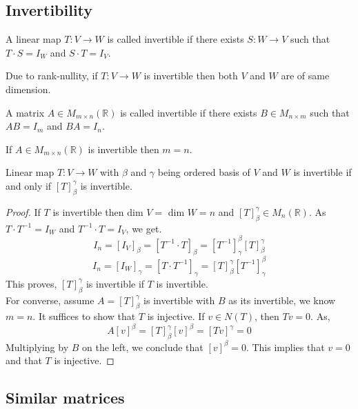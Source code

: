 \documentclass[11pt,a4paper]{colorart}
\def\l{\left}
\def\r{\right}
\def\R{\mathbb{R}}
\def\b{\beta}
\def\g{\gamma}
\begin{document}
\subsection{Invertibility}

\begin{definition}
	A linear map $T:V\rightarrow W$ is called invertible if there exists $S:W\rightarrow V$ such that $T\cdot S = I_W$ and $S\cdot T = I_V$.
\end{definition}

\begin{remark}
	Due to rank-nullity, if $T:V\rightarrow W$ is invertible then both $V$ and $W$ are of same dimension.
\end{remark}

\begin{definition}
	A matrix $A\in M_{m\times n}\l(\R\r)$ is called invertible if there exists $B\in M_{n\times m}$ such that $AB = I_m$ and $BA=I_n$.
\end{definition}

\begin{remark}
	If $A\in M_{m\times n}\l(\R\r)$ is invertible then $m=n$.
\end{remark}

\begin{theorem}
	Linear map $T:V\rightarrow W$ with $\b$ and $\g$ being ordered basis of $V$ and $W$ is invertible if and only if $\l[T\r]^\g_\b$ is invertible.
\end{theorem}

\begin{proof}
	If $T$ is invertible then dim $V = $ dim $W = n$ and $\l[T\r]_\b^\g\in M_n\l(\R\r)$. As $T\cdot T^{-1} = I_W$ and $T^{-1}\cdot T = I_V$, we get.
	\[ I_n = \l[I_V\r]_\b = \l[T^{-1}\cdot T\r]_\b = \l[T^{-1}\r]^\b_\g \l[T\r]^\g_\b \]
	\[ I_n = \l[I_W\r]_\g = \l[T\cdot T^{-1}\r]_\g = \l[T\r]^\g_\b \l[T^{-1}\r]^\b_\g \]
	This proves, $\l[T\r]^\g_\b$ is invertible if $T$ is invertible.\\
	For converse, assume $A= \l[T\r]^\g_\b$ is invertible with $B$ as its invertible, we know $m=n$. It suffices to show that $T$ is injective. If $v\in N\l(T\r)$, then $Tv=0$. As,
	\[A\l[v\r]^\b=\l[T\r]^\g_\b\l[v\r]^\b = \l[Tv\r]^\g = 0 \]
	Multiplying by $B$ on the left, we conclude that $\l[v\r]^\b = 0$. This implies that $v=0$ and that $T$ is injective.
\end{proof}

\subsection{Similar matrices}
\end{document}
